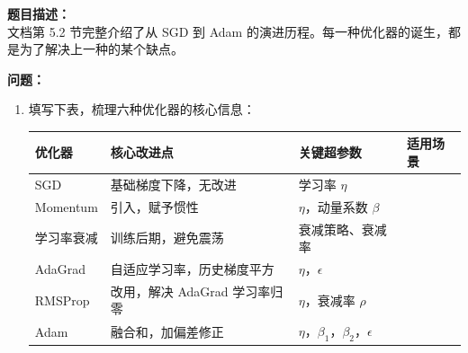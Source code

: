 \documentclass[a4paper,11pt]{ctexart}
\begin{document}
\begin{problembox}
    \textbf{题目描述：}\\
    文档第 5.2 节完整介绍了从 SGD 到 Adam 的演进历程。每一种优化器的诞生，都是为了解决上一种的某个缺点。

    \vspace{0.3cm}
    \textbf{问题：}
    \begin{enumerate}[(1)]
        \item 填写下表，梳理六种优化器的核心信息：

        \begin{center}
        \begin{tabular}{p{2.2cm} p{4.0cm} p{2.5cm} p{3.5cm}}
            \toprule
            优化器 & 核心改进点 & 关键超参数 & 适用场景 \\
            \midrule
            SGD & 基础梯度下降，无改进 & 学习率 $\eta$ & \underline{\hspace{3cm}} \\[1.2em]
            Momentum & 引入\underline{\hspace{2.0cm}}，赋予惯性 & $\eta$，动量系数 $\beta$ & \underline{\hspace{3cm}} \\[1.2em]
            学习率衰减 & 训练后期\underline{\hspace{2.0cm}}，避免震荡 & 衰减策略、衰减率 & \underline{\hspace{3cm}} \\[1.2em]
            AdaGrad & 自适应学习率，历史梯度平方\underline{\hspace{1.5cm}} & $\eta$，$\epsilon$ & \underline{\hspace{3cm}} \\[1.2em]
            RMSProp & 改用\underline{\hspace{2.0cm}}，解决 AdaGrad 学习率归零 & $\eta$，衰减率 $\rho$ & \underline{\hspace{3cm}} \\[1.2em]
            Adam & 融合\underline{\hspace{1cm}}和\underline{\hspace{1cm}}，加偏差修正 & $\eta$，$\beta_1$，$\beta_2$，$\epsilon$ & \underline{\hspace{3cm}} \\
            \bottomrule
        \end{tabular}
        \end{center}


\end{enumerate}
\end{problembox}
\end{document}
